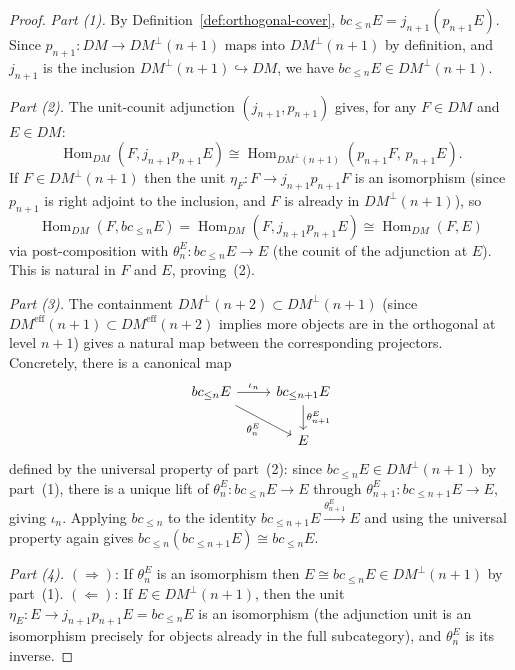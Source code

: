 \documentclass[12pt,a4paper]{article}
\theoremstyle{definition}
\newcommand{\Hom}{\operatorname{Hom}}
\begin{document}
\begin{proof}
\textit{Part (1).}  By Definition~\ref{def:orthogonal-cover},
$bc_{\leq n}E = j_{n+1}(p_{n+1}E)$.  Since $p_{n+1}:DM\to DM^\perp(n+1)$ maps
into $DM^\perp(n+1)$ by definition, and $j_{n+1}$ is the inclusion
$DM^\perp(n+1)\hookrightarrow DM$, we have $bc_{\leq n}E\in DM^\perp(n+1)$.

\textit{Part (2).}  The unit-counit adjunction $(j_{n+1},p_{n+1})$ gives, for any
$F\in DM$ and $E\in DM$:
\[
  \Hom_{DM}(F, j_{n+1}p_{n+1}E)
  \cong \Hom_{DM^\perp(n+1)}(p_{n+1}F,\, p_{n+1}E).
\]
If $F\in DM^\perp(n+1)$ then the unit $\eta_F:F\to j_{n+1}p_{n+1}F$ is an
isomorphism (since $p_{n+1}$ is right adjoint to the inclusion, and $F$ is already
in $DM^\perp(n+1)$), so
\[
  \Hom_{DM}(F, bc_{\leq n}E)
  = \Hom_{DM}(F, j_{n+1}p_{n+1}E)
  \cong \Hom_{DM}(F, E)
\]
via post-composition with $\theta_n^E:bc_{\leq n}E\to E$ (the counit of the
adjunction at $E$).  This is natural in $F$ and $E$, proving~(2).

\textit{Part (3).}  The containment $DM^\perp(n+2)\subset DM^\perp(n+1)$ (since
$DM^{\mathrm{eff}}(n+1)\subset DM^{\mathrm{eff}}(n+2)$ implies more objects are in the
orthogonal at level $n+1$) gives a natural map between the corresponding projectors.
Concretely, there is a canonical map
\[
\begin{tikzcd}
  bc_{\leq n}E \ar[r,"\iota_n"] \ar[dr,"\theta_n^E"']
    & bc_{\leq n+1}E \ar[d,"\theta_{n+1}^E"]\\
    & E
\end{tikzcd}
\]
defined by the universal property of part~(2): since $bc_{\leq n}E\in DM^\perp(n+1)$
by part~(1), there is a unique lift of $\theta_n^E:bc_{\leq n}E\to E$ through
$\theta_{n+1}^E:bc_{\leq n+1}E\to E$, giving $\iota_n$.  Applying $bc_{\leq n}$ to
the identity $bc_{\leq n+1}E\xrightarrow{\theta_{n+1}^E} E$ and using the universal
property again gives $bc_{\leq n}(bc_{\leq n+1}E)\cong bc_{\leq n}E$.

\textit{Part (4).}  $(\Rightarrow)$:  If $\theta_n^E$ is an isomorphism then
$E\cong bc_{\leq n}E\in DM^\perp(n+1)$ by part~(1).  $(\Leftarrow)$: If
$E\in DM^\perp(n+1)$, then the unit $\eta_E:E\to j_{n+1}p_{n+1}E = bc_{\leq n}E$
is an isomorphism (the adjunction unit is an isomorphism precisely for objects
already in the full subcategory), and $\theta_n^E$ is its inverse.
\end{proof}
\end{document}
